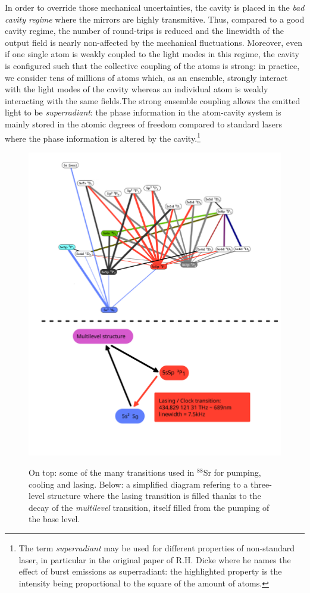 \documentclass[11pt]{report}
\begin{document}
In order to override those mechanical uncertainties, the cavity is placed in the \textit{bad cavity regime} where the mirrors are highly transmitive. Thus, compared to a good cavity regime, the number of round-trips is reduced and the linewidth of the output field is nearly non-affected by the mechanical fluctuations. Moreover, even if one single atom is weakly coupled to the light modes in this regime, the cavity is configured such that the collective coupling of the atoms is strong: in practice, we consider tens of millions of atoms which, as an ensemble, strongly interact with the light modes of the cavity whereas an individual atom is weakly interacting with the same fields.The strong ensemble coupling allows the emitted light to be \textit{superradiant}:  the phase information in the atom-cavity system is mainly stored in the atomic degrees of freedom compared to standard lasers where the phase information is altered by the cavity.\footnote{The term \textit{superradiant} may be used for different properties of non-standard laser, in particular in the original paper of R.H. Dicke where he names the effect of burst emissions as superradiant: the highlighted property is the intensity being proportional to the square of the amount of atoms.}

\begin{figure}[h!]
\caption{On top: some of the many transitions used in $^{88}$Sr for pumping, cooling and lasing. Below: a simplified diagram refering to a three-level structure where the lasing transition is filled thanks to the decay of the \textit{multilevel} transition, itself filled from the pumping of the base level.}
\centering
\includegraphics[width=\textwidth]{sr88}
\label{fig:sr88}
\end{figure}
\end{document}
